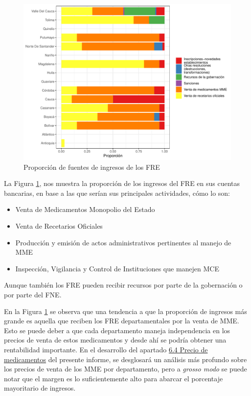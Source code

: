 \documentclass[
]{book}
\begin{document}
\begin{figure}[t]

{\centering \includegraphics[width=0.85\linewidth]{InformeFinal_files/figure-latex/IngresosFRE1-1} 

}

\caption{Proporción de fuentes de ingresos de los FRE}\label{fig:IngresosFRE1}
\end{figure}

La Figura \ref{fig:IngresosFRE1}, nos muestra la proporción de los ingresos del FRE en sus cuentas bancarias, en base a las que serían sus principales actividades, cómo lo son:

\begin{itemize}
\item
  Venta de Medicamentos Monopolio del Estado
\item
  Venta de Recetarios Oficiales
\item
  Producción y emisión de actos administrativos pertinentes al manejo de MME
\item
  Inspección, Vigilancia y Control de Instituciones que manejen MCE
\end{itemize}

Aunque también los FRE pueden recibir recursos por parte de la gobernación o por parte del FNE.

En la Figura \ref{fig:IngresosFRE1} se observa que una tendencia a que la proporción de ingresos más grande es aquella que reciben los FRE departamentales por la venta de MME. Esto se puede deber a que cada departamento maneja independencia en los precios de venta de estos medicamentos y desde ahí se podría obtener una rentabilidad importante. En el desarrollo del apartado \protect\hyperlink{precioMedicamentos}{6.4 Precio de medicamentos} del presente informe, se desglosará un análisis más profundo sobre los precios de venta de los MME por departamento, pero a \emph{grosso modo} se puede notar que el margen es lo suficientemente alto para abarcar el porcentaje mayoritario de ingresos.
\end{document}
